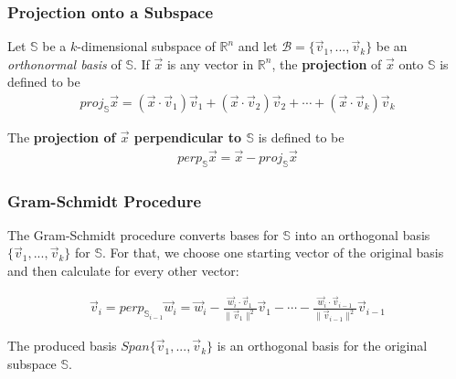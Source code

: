 \documentclass[a4paper,9pt]{extarticle}
\begin{document}
\begin{multicols*}{2}

\subsubsection{Projection onto a Subspace}
Let $\mathbb{S}$ be a $k$-dimensional subspace of $\mathbb{R}^n$ and let $\mathcal{B} = \{\vec{v}_1, ..., \vec{v}_k\}$ be an \textit{orthonormal basis} of $\mathbb{S}$. If $\vec{x}$ is any vector in $\mathbb{R}^n$, the \textbf{projection} of $\vec{x}$ onto $\mathbb{S}$ is defined to be
\begin{equation} \label{7.2-2}
    \begin{split}
        proj_\mathbb{S} \vec{x} = (\vec{x} \cdot \vec{v}_1) \vec{v}_1 + (\vec{x} \cdot \vec{v}_2) \vec{v}_2 + \cdots + (\vec{x} \cdot \vec{v}_k) \vec{v}_k
    \end{split}
\end{equation}

The \textbf{projection of $\vec{x}$ perpendicular to $\mathbb{S}$} is defined to be
\begin{equation} \label{7.2-3}
    \begin{split}
        perp_\mathbb{S} \vec{x} = \vec{x} - proj_\mathbb{S} \vec{x}
    \end{split}
\end{equation}


\subsubsection{Gram-Schmidt Procedure}
The Gram-Schmidt procedure converts bases for $\mathbb{S}$ into an orthogonal basis $\{\vec{v}_1, ..., \vec{v}_k\}$ for $\mathbb{S}$. For that, we choose one starting vector of the original basis and then calculate for every other vector:

\begin{equation} \label{7.2-4}
    \begin{split}
        \vec{v}_i = perp_{\mathbb{S}_{i - 1}} \vec{w}_i = \vec{w}_i - \frac{\vec{w}_i \cdot \vec{v}_1}{\|\vec{v}_1\|^2} \vec{v}_1 - \cdots - \frac{\vec{w}_i \cdot \vec{v}_{i - 1}}{\|\vec{v}_{i - 1}\|^2} \vec{v}_{i - 1}
    \end{split}
\end{equation}

The produced basis $Span \{\vec{v}_1, ..., \vec{v}_k\}$ is an orthogonal basis for the original subspace $\mathbb{S}$.


\end{multicols*}
\end{document}
